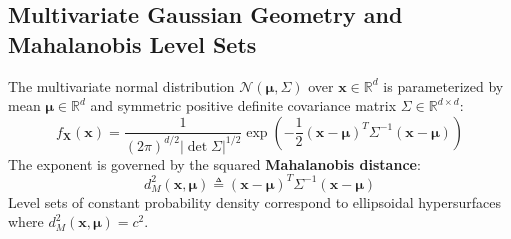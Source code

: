 \subsection{Multivariate Gaussian Geometry and Mahalanobis Level Sets}
The multivariate normal distribution $\mathcal{N}(\boldsymbol{\mu}, \Sigma)$ over $\mathbf{x} \in \mathbb{R}^d$ is parameterized by mean $\boldsymbol{\mu} \in \mathbb{R}^d$ and symmetric positive definite covariance matrix $\Sigma \in \mathbb{R}^{d \times d}$:
\begin{equation}
f_{\mathbf{X}}(\mathbf{x}) = \frac{1}{(2\pi)^{d/2} |\det \Sigma|^{1/2}} \exp\left( -\frac{1}{2}(\mathbf{x} - \boldsymbol{\mu})^T \Sigma^{-1} (\mathbf{x} - \boldsymbol{\mu}) \right)
\label{eq:multivariate_gaussian}
\end{equation}
The exponent is governed by the squared \textbf{Mahalanobis distance}:
\begin{equation}
d_M^2(\mathbf{x}, \boldsymbol{\mu}) \triangleq (\mathbf{x} - \boldsymbol{\mu})^T \Sigma^{-1} (\mathbf{x} - \boldsymbol{\mu})
\end{equation}
Level sets of constant probability density correspond to ellipsoidal hypersurfaces where $d_M^2(\mathbf{x}, \boldsymbol{\mu}) = c^2$.


